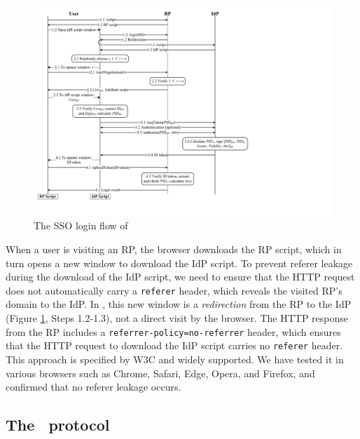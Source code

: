 \begin{figure}[htb]
  \centering
  \includegraphics[height=0.5591\textheight]{fig/process-js.pdf}
  \caption{The SSO login flow of \usso}
  \label{fig:process}
\end{figure}

When a user is visiting an RP, the browser downloads the RP script, which in turn opens a new window to download the IdP script. To prevent referer leakage during the download of the IdP script, we need to ensure that the HTTP request does not automatically carry a \verb+referer+ header, which reveals the visited RP's domain to the IdP. %
In \usso, this new window is a \emph{redirection} from the RP to the IdP (Figure \ref{fig:process}, Steps 1.2-1.3), not a direct visit by the browser.
The HTTP response from the RP includes a \verb+referrer-policy=no-referrer+ header, which ensures that the HTTP request to download the IdP script carries no \verb+referer+ header.
This approach is specified by W3C \cite{referer_policy} and widely supported. We have tested it in various browsers such as Chrome, Safari, Edge, Opera, and Firefox, and confirmed that no referer leakage occurs.




\subsection{The \usso\ protocol}
\label{implementations}

